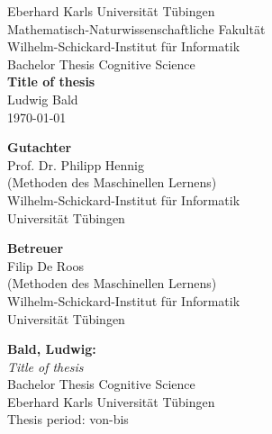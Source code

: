\documentclass[twoside,12pt,a4paper]{report}
\begin{document}

\begin{titlepage}
	\begin{center}
		{\LARGE Eberhard Karls Universit\"at T\"ubingen}\\
		{\large Mathematisch-Naturwissenschaftliche Fakult\"at \\
			Wilhelm-Schickard-Institut f\"ur Informatik\\[4cm]}
		{\huge Bachelor Thesis Cognitive Science\\[2cm]}
		{\Large\bf  Title of thesis\\[1.5cm]}
		{\large Ludwig Bald}\\[0.5cm]
		\today \\[4cm]
		\parbox{7cm}{\begin{center}{{\small\bf Gutachter}\\
				[0.5cm]\large Prof. Dr. Philipp Hennig}\\
				(Methoden des Maschinellen Lernens)\\
				{\footnotesize Wilhelm-Schickard-Institut f\"ur Informatik\\
				Universit\"at T\"ubingen}\end{center}}\hfill\parbox{7cm}
				{\begin{center}
				{\small\bf Betreuer}\\[0.5cm]
				{\large Filip De Roos}\\
				(Methoden des Maschinellen Lernens)\\
				{\footnotesize Wilhelm-Schickard-Institut f\"ur Informatik\\
					Universit\"at T\"ubingen}\end{center}
		}
	\end{center}
\end{titlepage}



\thispagestyle{empty}
\vspace*{\fill}
\begin{minipage}{11.2cm}
	\textbf{Bald, Ludwig:}\\
	\emph{Title of thesis}\\ Bachelor Thesis Cognitive Science\\
	Eberhard Karls Universit\"at T\"ubingen\\
	Thesis period: von-bis
\end{minipage}
\newpage
\end{document}
